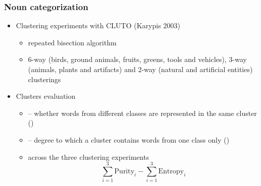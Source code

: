 \begin{frame}
\frametitle{Noun categorization}
\begin{itemize}
\item Clustering experiments with CLUTO (Karypis 2003)
\begin{itemize}
\item repeated bisection algorithm
\item 6-way (birds, ground animals, fruits, greens,
tools and vehicles), 3-way (animals, plants and
artifacts) and 2-way (natural and artificial entities) clusterings
\end{itemize}
\pause
\item Clusters evaluation
\begin{itemize}
\item {} -- whether words from different classes are represented in the same cluster ()
\item {} -- degree to which a cluster contains words from one class only ()
\item {} across the three clustering experiments
\begin{displaymath}
\sum_{i=1}^3 \text{Purity}_i -  \sum_{i=1}^3 \text{Entropy}_i
\end{displaymath}

\end{itemize}
\end{itemize}
\end{frame}





